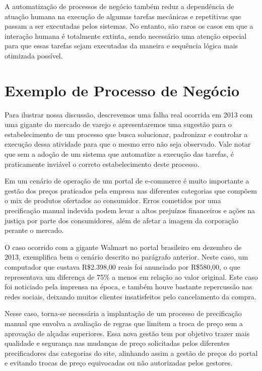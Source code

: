 A automatização de processos de negócio também reduz a dependência de atuação humana na execução de algumas tarefas mecânicas e repetitivas que passam a ser executadas pelos sistemas. No entanto, são raros os casos em que a interação humana é totalmente extinta, sendo necessário uma atenção especial para que essas tarefas sejam executadas da maneira e sequência lógica mais otimizada possível.

\section{Exemplo de Processo de Negócio}\label{sec:introducao-caso_real}

Para ilustrar nossa discussão, descrevemos uma falha real ocorrida em 2013 com uma gigante do mercado de varejo e apresentaremos uma sugestão para o estabelecimento de um processo que busca solucionar, padronizar e controlar a execução dessa atividade para que o mesmo erro não seja observado. Vale notar que sem a adoção de um sistema que automatize a execução das tarefas, é praticamente inviável o correto estabelecimento deste processo.

Em um cenário de operação de um portal de e-commerce é muito importante a gestão dos preços praticados pela empresa nas diferentes categorias que compõem o mix de produtos ofertados ao consumidor. Erros cometidos por uma precificação manual indevida podem levar a altos prejuízos financeiros e ações na justiça por parte dos consumidores, além de afetar a imagem da corporação perante o mercado. 

O caso ocorrido com a gigante Walmart no portal brasileiro em dezembro de 2013, exemplifica bem o cenário descrito no parágrafo anterior. Neste caso, um computador que custava R\$2.398,00 reais foi anunciado por R\$580,00, o que representava um diferença de 75\% a menos em relação ao valor original. Este caso foi noticiado pela imprensa na época, e também houve bastante repercussão nas redes sociais, deixando muitos clientes insatisfeitos pelo cancelamento da compra\cite{noticia_erro_walmart}. 

Nesse caso, torna-se necessária a implantação de um processo de precificação manual que envolva a avaliação de regras que limitem a troca de preço sem a aprovação de alçadas superiores. Essa nova gestão tem por objetivo trazer mais qualidade e segurança nas mudanças de preço solicitadas pelos diferentes precificadores das categorias do site, alinhando assim a gestão de preços do portal e evitando trocas de preço equivocadas ou não autorizadas pelos gestores.

